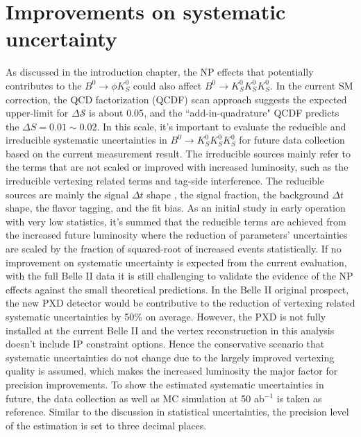 \section{Improvements on systematic uncertainty}
As discussed in the introduction chapter, the NP effects that potentially contributes to the $B^0\to \phi K_S^0$ could also affect $B^0 \to K_S^0  K_S^0  K_S^0$. In the current SM correction, the QCD factorization (QCDF) scan approach suggests the expected upper-limit for $\Delta \mathcal{S}$ is about 0.05\cite{b2book}, and the ``add-in-quadrature" QCDF predicts the $\Delta S = 0.01 \sim 0.02$\cite{b2book}. In this scale, it's important to evaluate the reducible and irreducible systematic uncertainties in $B^0 \to K_S^0  K_S^0  K_S^0$ for future data collection based on the current measurement result. 
The irreducible sources mainly refer to the terms that are not scaled or improved with increased luminosity, such as the irreducible vertexing related terms and tag-side interference\cite{b2book}. The reducible sources are mainly the signal $\Delta t$ shape , the signal fraction, the background $\Delta t$ shape, the flavor tagging, and the fit bias. As an initial study in early operation with very low statistics, it's summed that the reducible terms are achieved from the increased future luminosity where the reduction of parameters' uncertainties are scaled by the fraction of squared-root of increased events statistically. If no improvement on systematic uncertainty is expected from the current evaluation, with the full Belle II data it is still challenging to validate the evidence of the NP effects against the small theoretical predictions. In the Belle II original prospect, the new PXD detector would be contributive to the reduction of vertexing related systematic uncertainties by 50\% on average. However, the PXD is not fully installed at the current Belle II  and the vertex reconstruction in this analysis doesn't include IP constraint options. Hence the conservative scenario that systematic uncertainties do not change due to the largely improved vertexing quality is assumed, which makes the increased luminosity the major factor for precision improvements. To show the estimated systematic uncertainties in future, the data collection as well as MC simulation at 50 ab$^{-1}$ is taken as reference. Similar to the discussion in statistical uncertainties, the precision level of the estimation is set to three decimal places\cite{b2book}.


